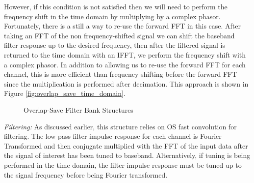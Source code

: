 \documentclass[12pt]{report}
\begin{document}
However, if this condition is not satisfied then we will need to perform the
frequency shift in the time domain by multiplying by a complex phasor.
Fortunately, there is a still a way to re-use the forward FFT in this case.
After taking an FFT of the non frequency-shifted signal we can shift the
baseband filter response up to the desired frequency, then after the filtered
signal is returned to the time domain with an IFFT, we perform the frequency
shift with a complex phasor.  In addition to allowing us to re-use the forward
FFT for each channel, this is more efficient than frequency shifting before the
forward FFT since the multiplication is performed after decimation. This
approach is shown in Figure \ref{fig:overlap_save_time_domain}.

\begin{figure}[bh!]
\centerline{
    \hfill
}
\caption{Overlap-Save Filter Bank Structures}
\label{fig:overlap_save_filter_banks}
\end{figure}

\emph{Filtering:} As discussed earlier, this structure relies on OS fast
convolution for filtering. The low-pass filter impulse response for each
channel is Fourier Transformed and then conjugate multiplied with the FFT of
the input data after the signal of interest has been tuned to baseband.
Alternatively, if tuning is being performed in the time domain, the filter
impulse response must be tuned up to the signal frequency before being Fourier
transformed.
\end{document}
